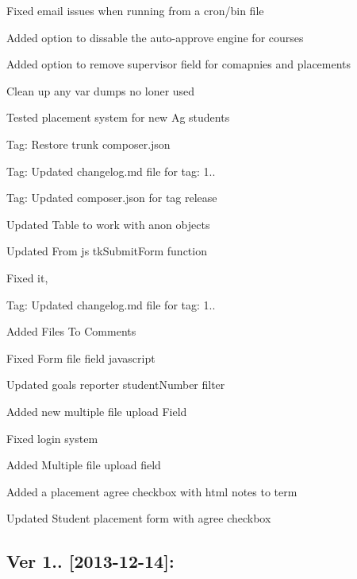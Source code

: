 \begin{DoxyItemize}
\item Fixed email issues when running from a cron/bin file
\item Added option to dissable the auto-\/approve engine for courses
\item Added option to remove supervisor field for comapnies and placements
\item Clean up any var dumps no loner used
\item Tested placement system for new Ag students
\item Tag\+: Restore trunk composer.\+json
\item Tag\+: Updated changelog.\+md file for tag\+: 1..
\item Tag\+: Updated composer.\+json for tag release
\item Updated Table to work with anon objects
\item Updated From js tk\+Submit\+Form function
\item Fixed it,
\item Tag\+: Updated changelog.\+md file for tag\+: 1..
\item Added Files To Comments
\item Fixed Form file field javascript
\item Updated goals reporter student\+Number filter
\item Added new multiple file upload Field
\item Fixed login system
\item Added Multiple file upload field
\item Added a placement agree checkbox with html notes to term
\item Updated Student placement form with agree checkbox
\end{DoxyItemize}

\subsection*{Ver 1.. \mbox{[}2013-\/12-\/14\mbox{]}\+: }


